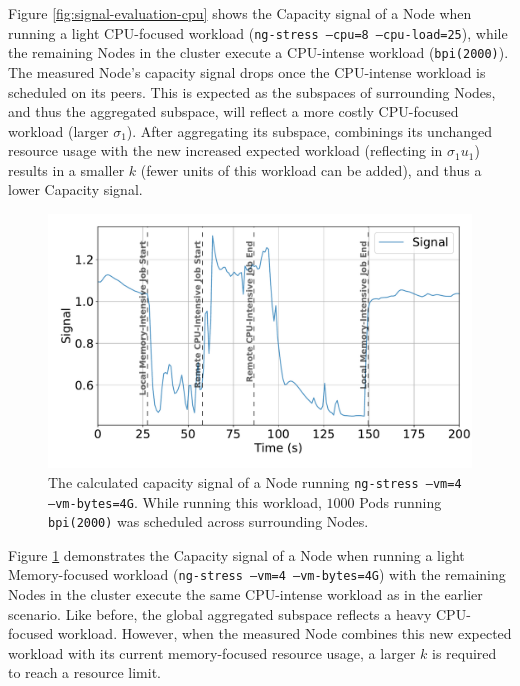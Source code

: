 Figure \ref{fig:signal-evaluation-cpu} shows the Capacity signal of a Node when
running a light CPU-focused workload (\texttt{ng-stress --cpu=8 --cpu-load=25}),
while the remaining Nodes in the cluster execute a CPU-intense workload
(\texttt{bpi(2000)}). The measured Node's capacity signal drops once the
CPU-intense workload is scheduled on its peers. This is expected as the
subspaces of surrounding Nodes, and thus the aggregated subspace, will reflect a
more costly CPU-focused workload (larger $\sigma_1$).  After aggregating its
subspace, combinings its unchanged resource usage with the new increased
expected workload (reflecting in $\sigma_1 u_1$) results in a smaller $k$ (fewer
units of this workload can be added), and thus a lower Capacity signal.

\begin{figure}[ht]
    \centering
    \includegraphics[width=\textwidth]{images/signal-with-memory.pdf}
    \caption{The calculated capacity signal of a Node running \texttt{ng-stress
    --vm=4 --vm-bytes=4G}. While running this workload, $1000$ Pods running
    \texttt{bpi(2000)} was scheduled across surrounding Nodes.}
    \label{fig:signal-evaluation-mem}
\end{figure}

Figure \ref{fig:signal-evaluation-mem} demonstrates the Capacity signal of a
Node when running a light Memory-focused workload (\texttt{ng-stress --vm=4
--vm-bytes=4G}) with the remaining Nodes in the cluster execute the same
CPU-intense workload as in the earlier scenario. Like before, the global
aggregated subspace reflects a heavy CPU-focused workload. However, when the
measured Node combines this new expected workload with its current
memory-focused resource usage, a larger $k$ is required to reach a resource
limit.


